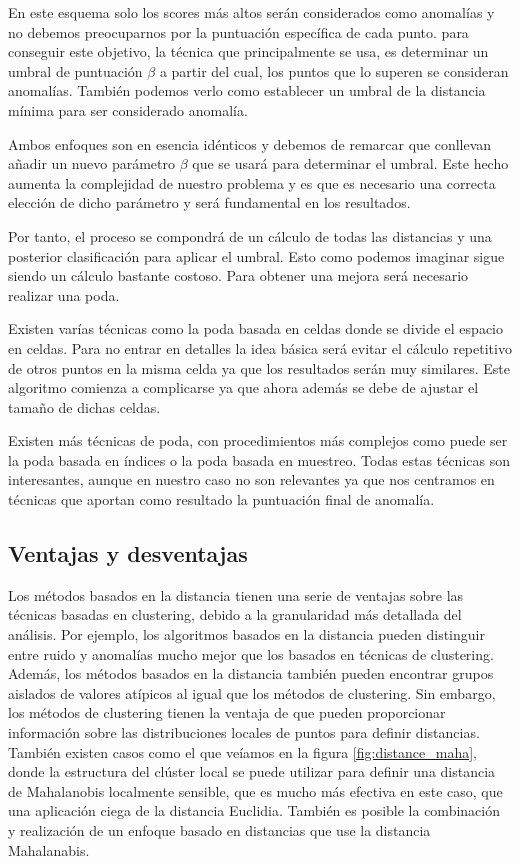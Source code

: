 En este esquema solo los scores más altos serán considerados como anomalías 
y no debemos preocuparnos por la puntuación específica de cada punto.
para conseguir este objetivo, la técnica que principalmente se usa, es determinar
un umbral de puntuación $\beta$ a partir del cual, los puntos que lo superen se consideran
anomalías. También podemos verlo como establecer un umbral de la distancia mínima para 
ser considerado anomalía.


Ambos enfoques son en esencia idénticos y debemos de remarcar que conllevan 
añadir un nuevo parámetro $\beta$ que se usará para determinar el umbral. 
Este hecho aumenta la complejidad de nuestro problema y es que es necesario
una correcta elección de dicho parámetro y será fundamental en los resultados.


Por tanto, el proceso se compondrá de un cálculo de todas las distancias y una
posterior clasificación para aplicar el umbral. Esto como podemos imaginar sigue
siendo un cálculo bastante costoso. Para obtener una mejora será necesario
realizar una poda. 


Existen varías técnicas como la poda basada en celdas donde se divide el espacio
en celdas. Para no entrar en detalles la idea básica será evitar el cálculo
repetitivo de otros puntos en la misma celda ya que los resultados serán muy similares.
Este algoritmo comienza a complicarse ya que ahora además se debe de ajustar 
el tamaño de dichas celdas.


Existen más técnicas de poda, con procedimientos más complejos como puede ser la 
poda basada en índices o la poda basada en muestreo. Todas estas técnicas son
interesantes, aunque en nuestro caso no son relevantes ya que nos centramos en técnicas
que aportan como resultado la puntuación final de anomalía.


\subsection{Ventajas y desventajas}
Los métodos basados en la distancia tienen una serie de ventajas 
sobre las técnicas basadas en clustering, debido a la granularidad 
más detallada del análisis. Por ejemplo, los algoritmos basados en la 
distancia pueden distinguir entre ruido y anomalías mucho mejor que los 
basados en técnicas de clustering. Además, los métodos basados en la
distancia también pueden encontrar grupos aislados de valores atípicos
al igual que los métodos de clustering. Sin embargo, los métodos de 
clustering tienen la ventaja de que
pueden proporcionar información sobre las distribuciones locales 
de puntos para definir distancias. También existen casos como el que veíamos
en la figura \ref{fig:distance_maha}, donde la estructura del clúster local se
puede utilizar para definir una distancia de Mahalanobis localmente 
sensible, que es mucho más efectiva en este caso, que una aplicación ciega de
la distancia Euclidia. También es posible la combinación y realización de
un enfoque basado en distancias que use la distancia Mahalanabis.

